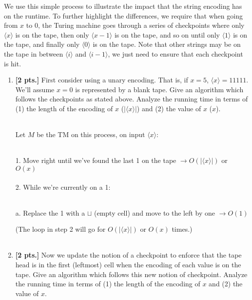\documentclass[11pt]{article}
\theoremstyle{definition}
\theoremstyle{theorem}
\newcommand{\solution}{\medskip\noindent{\color{blue}\textbf{Solution:}}}
\begin{document}
We use this simple process to illustrate the impact that the string encoding has on the runtime. To further highlight the differences, we require that when going from $x$ to $0$, the Turing machine goes through a series of checkpoints where only $\langle x \rangle$ is on the tape, then only $\langle x-1 \rangle$ is on the tape, and so on until only $\langle 1 \rangle$ is on the tape, and finally only $\langle 0 \rangle$ is on the tape. Note that other strings may be on the tape in between $\langle i \rangle$ and $\langle i-1 \rangle$, we just need to ensure that each checkpoint is hit.

\begin{enumerate}[label=(\alph*)]

\item \textbf{[2 pts.]} First consider using a unary encoding. That is, if $x = 5$, $\langle x \rangle = 11111$. We'll assume $x=0$ is represented by a blank tape. Give an algorithm which follows the checkpoints as stated above. Analyze the running time in terms of (1) the length of the encoding of $x$ ($|\langle x \rangle|$) and (2) the value of $x$ ($x$).

\solution\\
Let $M$ be the TM on this process, on input $\langle x \rangle$: \\~\\
\hspace*{0.5cm}
\begin{minipage}{0.9\textwidth}
1. Move right until we've found the last 1 on the tape  \hspace{0.5cm} $\rightarrow O(|\langle x \rangle|)$ or $O(x)$   \\~\\
2. While we're currently on a 1:  \\~\\
\hspace*{0.54cm}
\begin{minipage}{0.9\textwidth}
	a. Replace the 1 with a $\sqcup$ (empty cell) and move to the left by one \hspace{0.5cm} $\rightarrow O(1)$  \\
\end{minipage}
(The loop in step 2 will go for $O(|\langle x \rangle|)$ or $O(x)$ times.) \\~\\  
\end{minipage}


\item \textbf{[2 pts.]} Now we update the notion of a checkpoint to enforce that the tape head is in the first (leftmost) cell when the encoding of each value is on the tape.
Give an algorithm which follows this new notion of checkpoint. Analyze the running time in terms of (1) the length of the encoding of $x$ and (2) the value of $x$.


\end{enumerate}
\end{document}

